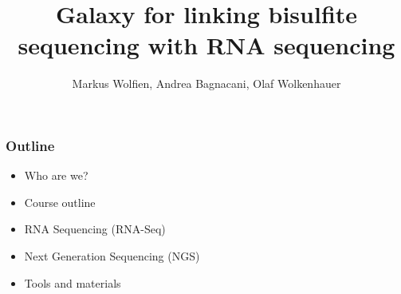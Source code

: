 \documentclass[x11names, svgnames]{beamer}
\title{Galaxy for linking bisulfite sequencing with RNA sequencing}
\author{Markus Wolfien, Andrea Bagnacani, Olaf Wolkenhauer}
\begin{document}
%
%



%
%
\newcommand{\one}{Who are we?}
\newcommand{\two}{Course outline}
\newcommand{\three}{RNA Sequencing (RNA-Seq)}
\newcommand{\four}{Next Generation Sequencing (NGS)}
\newcommand{\five}{Tools and materials}
\begin{frame}
  \frametitle{Outline}
  \begin{itemize}
    \itemsep1em
    \item \one
    \item \two
    \item \three
    \item \four
    \item \five
  \end{itemize}
\end{frame}
\end{document}
